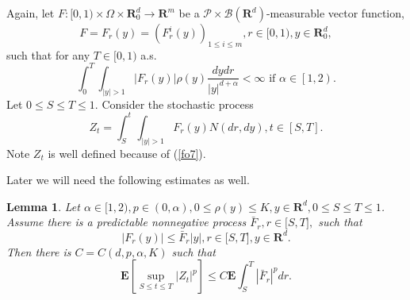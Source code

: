 \documentclass[11pt]{amsart}
\theoremstyle{plain}
\newtheorem{lemma}{Lemma}
\numberwithin{equation}{section}
\begin{document}
Again, let $F:[0,1)\times \Omega \times \mathbf{R}_{0}^{d}\rightarrow 
\mathbf{R}^{m}$ be a $\mathcal{P\times B}\left( \mathbf{R}^{d}\right)$-measurable vector function, 
\begin{equation*}
F=F_{r}\left( y\right) =\left( F_{r}^{i}\left( y\right) \right) _{1\leq
i\leq m},r\in \lbrack 0,1),y\in \mathbf{R}_{0}^{d},
\end{equation*}such that for any $T\in \lbrack 0,1)$ a.s.\begin{equation}
\int_{0}^{T}\int_{\left\vert y\right\vert >1}\left\vert F_{r}\left( y\right)
\right\vert \rho\left( y\right)\frac{dydr}{\left\vert y\right\vert
^{d+\alpha }}<\infty \text{ if }\alpha \in \left[ 1,2\right) .  \label{fo7}
\end{equation}
Let $0\leq S\leq T\leq 1.$ Consider the stochastic process 
\begin{equation*}
Z_{t}=\int_{S}^{t}\int_{\left\vert y\right\vert >1}F_{r}\left( y\right)
N\left( dr,dy\right) ,t\in \left[ S,T\right].
\end{equation*}Note $Z_t$ is well defined because of (\ref{fo7}).

Later we will need the following estimates as well.

\begin{lemma}
\label{ele2}Let $\alpha \in \lbrack 1,2),p\in \left( 0,\alpha \right) ,0\leq
\rho \left( y\right) \leq K,y\in \mathbf{R}^{d},0\leq S\leq T\leq 1$. Assume
there is a predictable nonnegative process $\bar{F}_{r},r\in \lbrack S,T],$
such that\begin{equation*}
\left\vert F_{r}\left( y\right) \right\vert \leq \bar{F}_{r}\left\vert
y\right\vert ,r\in \lbrack S,T],y\in \mathbf{R}^{d}.
\end{equation*}
Then there is $C=C\left( d,p,\alpha ,K\right) $ such that\begin{equation*}
\mathbf{E}\left[ \sup_{S\leq t\leq T}\left\vert Z_{t}\right\vert ^{p}\right]
\leq C\mathbf{E}\int_{S}^{T}\left\vert \bar{F}_{r}\right\vert ^{p}dr.
\end{equation*}
\end{lemma}
\end{document}

